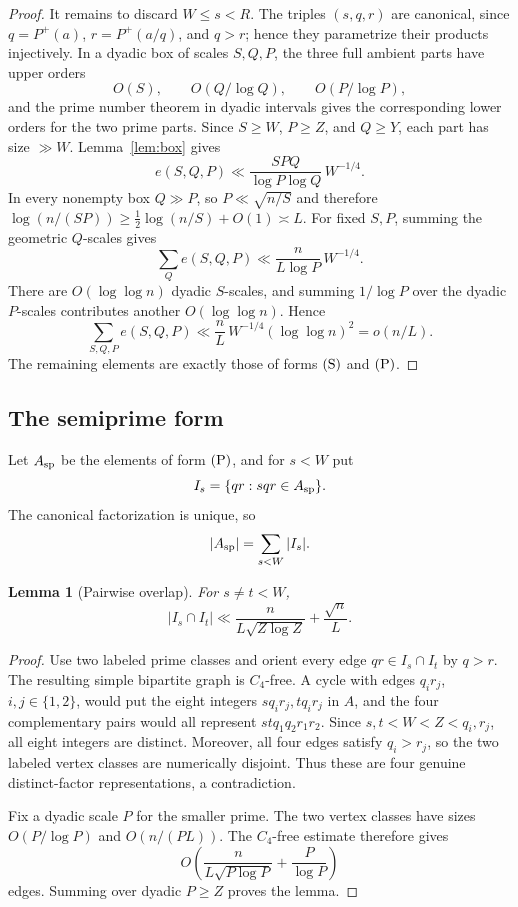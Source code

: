 \documentclass[11pt,reqno]{article}
\newtheorem{lemma}[theorem]{Lemma}
\theoremstyle{definition}
\begin{document}
\begin{proof}
It remains to discard \(W\leq s<R\).  The triples \((s,q,r)\) are
canonical, since \(q=P^+(a)\), \(r=P^+(a/q)\), and \(q>r\); hence they
parametrize their products injectively.  In a dyadic box of scales
\(S,Q,P\), the three full ambient parts have upper orders
\[
  O(S),\qquad O(Q/\log Q),\qquad O(P/\log P),
\]
and the prime number theorem in dyadic intervals gives the corresponding
lower orders for the two prime parts.  Since \(S\geq W\), \(P\geq Z\), and
\(Q\geq Y\), each part has size \(\gg W\).  Lemma~\ref{lem:box} gives
\[
  e(S,Q,P)\ll
  \frac{SPQ}{\log P\log Q}\,W^{-1/4}.
\]
In every nonempty box \(Q\gg P\), so \(P\ll\sqrt{n/S}\) and therefore
\(\log(n/(SP))\geq\tfrac12\log(n/S)+O(1)\asymp L\).  For fixed \(S,P\),
summing the geometric \(Q\)-scales gives
\[
  \sum_Q e(S,Q,P)\ll\frac n{L\log P}\,W^{-1/4}.
\]
There are \(O(\log\log n)\) dyadic \(S\)-scales, and summing
\(1/\log P\) over the dyadic \(P\)-scales contributes another
\(O(\log\log n)\).  Hence
\[
  \sum_{S,Q,P}e(S,Q,P)
  \ll \frac nL\,W^{-1/4}(\log\log n)^2=o(n/L).
\]
The remaining elements are exactly those of forms \({\rm (S)}\) and
\({\rm (P)}\).
\end{proof}

\subsection{The semiprime form}

Let \(A_{\rm sp}\) be the elements of form \({\rm (P)}\), and for \(s<W\)
put
\[
  I_s=\{qr:sqr\in A_{\rm sp}\}.
\]
The canonical factorization is unique, so
\[
  |A_{\rm sp}|=\sum_{s<W}|I_s|.
\]

\begin{lemma}[Pairwise overlap]\label{lem:overlap}
For \(s\neq t<W\),
\[
  |I_s\cap I_t|
  \ll \frac{n}{L\sqrt{Z\log Z}}+\frac{\sqrt n}{L}.
\]
\end{lemma}

\begin{proof}
Use two labeled prime classes and orient every edge \(qr\in I_s\cap I_t\)
by \(q>r\).  The resulting simple bipartite graph is \(C_4\)-free.  A cycle
with edges \(q_ir_j\), \(i,j\in\{1,2\}\), would put the eight integers
\(sq_ir_j,tq_ir_j\) in \(A\), and the four complementary pairs would all
represent \(stq_1q_2r_1r_2\).  Since
\(s,t<W<Z<q_i,r_j\), all eight integers are distinct.  Moreover, all four
edges satisfy \(q_i>r_j\), so the two labeled vertex classes are numerically
disjoint.  Thus these are four genuine distinct-factor representations,
a contradiction.

Fix a dyadic scale \(P\) for the smaller prime.  The two vertex classes
have sizes \(O(P/\log P)\) and \(O(n/(PL))\).  The \(C_4\)-free estimate
therefore gives
\[
  O\left(\frac{n}{L\sqrt{P\log P}}+\frac{P}{\log P}\right)
\]
edges.  Summing over dyadic \(P\geq Z\) proves the lemma.
\end{proof}
\end{document}
